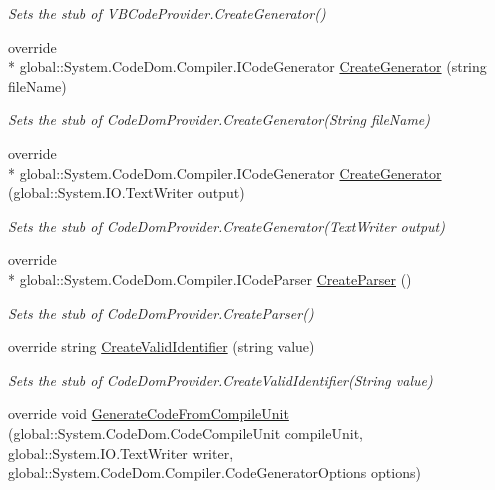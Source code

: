 \begin{DoxyCompactItemize}
\begin{DoxyCompactList}\small\item\em Sets the stub of V\-B\-Code\-Provider.\-Create\-Generator()\end{DoxyCompactList}\item 
override \\*
global\-::\-System.\-Code\-Dom.\-Compiler.\-I\-Code\-Generator \hyperlink{class_microsoft_1_1_visual_basic_1_1_fakes_1_1_stub_v_b_code_provider_ad7e9a22451eae8cb2ebc05bf5081841a}{Create\-Generator} (string file\-Name)
\begin{DoxyCompactList}\small\item\em Sets the stub of Code\-Dom\-Provider.\-Create\-Generator(\-String file\-Name)\end{DoxyCompactList}\item 
override \\*
global\-::\-System.\-Code\-Dom.\-Compiler.\-I\-Code\-Generator \hyperlink{class_microsoft_1_1_visual_basic_1_1_fakes_1_1_stub_v_b_code_provider_ad9d03919765aebfacba6c05d0407fca2}{Create\-Generator} (global\-::\-System.\-I\-O.\-Text\-Writer output)
\begin{DoxyCompactList}\small\item\em Sets the stub of Code\-Dom\-Provider.\-Create\-Generator(\-Text\-Writer output)\end{DoxyCompactList}\item 
override \\*
global\-::\-System.\-Code\-Dom.\-Compiler.\-I\-Code\-Parser \hyperlink{class_microsoft_1_1_visual_basic_1_1_fakes_1_1_stub_v_b_code_provider_a2b601389c1ce900ef0ccb85deae1a720}{Create\-Parser} ()
\begin{DoxyCompactList}\small\item\em Sets the stub of Code\-Dom\-Provider.\-Create\-Parser()\end{DoxyCompactList}\item 
override string \hyperlink{class_microsoft_1_1_visual_basic_1_1_fakes_1_1_stub_v_b_code_provider_ab0d0556e0191a5d904f791cd74eb04dc}{Create\-Valid\-Identifier} (string value)
\begin{DoxyCompactList}\small\item\em Sets the stub of Code\-Dom\-Provider.\-Create\-Valid\-Identifier(\-String value)\end{DoxyCompactList}\item 
override void \hyperlink{class_microsoft_1_1_visual_basic_1_1_fakes_1_1_stub_v_b_code_provider_a246ccd19bca991d69b8ec2b62244018a}{Generate\-Code\-From\-Compile\-Unit} (global\-::\-System.\-Code\-Dom.\-Code\-Compile\-Unit compile\-Unit, global\-::\-System.\-I\-O.\-Text\-Writer writer, global\-::\-System.\-Code\-Dom.\-Compiler.\-Code\-Generator\-Options options)

\end{DoxyCompactItemize}

